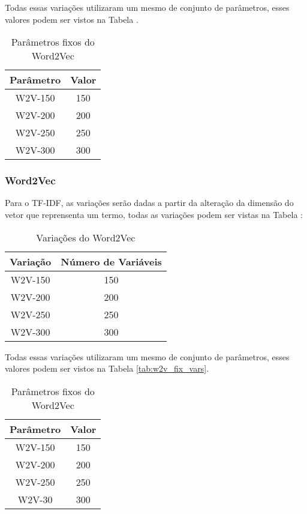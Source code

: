 Todas essas variações utilizaram um mesmo de conjunto de parâmetros, esses valores podem ser vistos na Tabela \label{tab:w2v_fix_vars}.

\begin{table}[H]
\label{tab:w2v_vars}
\centering
\begin{tabular}{|c| c|}
\hline
Parâmetro &  Valor  \\ 
\hline
W2V-150 &  150 \\
\hline
W2V-200 & 200 \\
\hline
W2V-250 &  250 \\
\hline   
W2V-300 & 300 \\
\hline 
\end{tabular}
\caption{Parâmetros fixos do Word2Vec}
\end{table}

\subsubsection{Word2Vec}

Para o TF-IDF, as variações serão dadas a  partir da alteração da dimensão do vetor que reprensenta um termo, todas as variações podem ser vistas na Tabela \label{tab:w2v_vars}:
\begin{table}[H]
\label{tab:w2v_vars}
\centering
\begin{tabular}{|c| c|}
\hline
Variação &  Número de Variáveis  \\ 
\hline
W2V-150 &  150 \\
\hline
W2V-200 & 200 \\
\hline
W2V-250 &  250 \\
\hline   
W2V-300 & 300 \\
\hline 
\end{tabular}
\caption{Variações do Word2Vec}
\end{table}

Todas essas variações utilizaram um mesmo de conjunto de parâmetros, esses valores podem ser vistos na Tabela \ref{tab:w2v_fix_vars}.

\begin{table}[H]
\label{w2v_fix_vars}
\centering
\begin{tabular}{|c| c|}
\hline
Parâmetro &  Valor  \\ 
\hline
W2V-150 &  150 \\
\hline
W2V-200 & 200 \\
\hline
W2V-250 &  250 \\
\hline   
W2V-30 & 300 \\
\hline 
\end{tabular}
\caption{Parâmetros fixos do Word2Vec}
\end{table}
